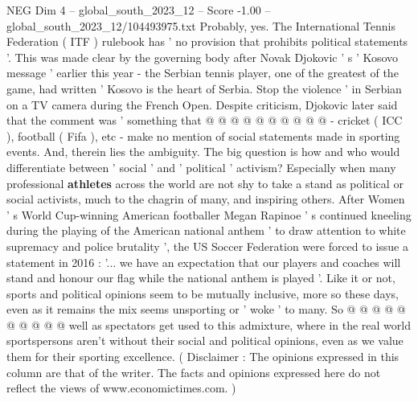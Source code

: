 \begin{textsample}{NEG Dim 4 – global\_south\_2023\_12 – Score -1.00 – global\_south\_2023\_12/104493975.txt}
Probably, yes.
The International Tennis Federation ( ITF ) rulebook has ' no provision that prohibits political statements '.
This was made clear by the governing body after Novak Djokovic ' s ' Kosovo message ' earlier this year - the Serbian tennis player, one of the greatest of the game, had written ' Kosovo is the heart of Serbia.
Stop the violence ' in Serbian on a TV camera during the French Open.
Despite criticism, Djokovic later said that the comment was ' something that @ @ @ @ @ @ @ @ @ @ - cricket ( ICC ), football ( Fifa ), etc - make no mention of social statements made in sporting events.
And, therein lies the ambiguity.
The big question is how and who would differentiate between ' social ' and ' political ' activism?
Especially when many professional \textbf{athletes} across the world are not shy to take a stand as political or social activists, much to the chagrin of many, and inspiring others.
After Women ' s World Cup-winning American footballer Megan Rapinoe ' s continued kneeling during the playing of the American national anthem ' to draw attention to white supremacy and police brutality ', the US Soccer Federation were forced to issue a statement in 2016 : '... we have an expectation that our players and coaches will stand and honour our flag while the national anthem is played '.
Like it or not, sports and political opinions seem to be mutually inclusive, more so these days, even as it remains the mix seems unsporting or ' woke ' to many.
So @ @ @ @ @ @ @ @ @ @ well as spectators get used to this admixture, where in the real world sportspersons aren't without their social and political opinions, even as we value them for their sporting excellence. ( Disclaimer : The opinions expressed in this column are that of the writer.
The facts and opinions expressed here do not reflect the views of www.economictimes.com. )

\end{textsample}

